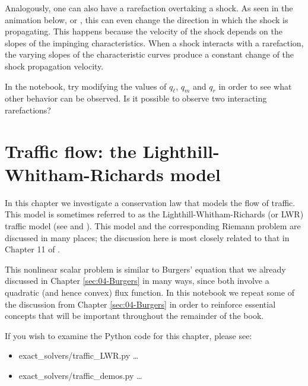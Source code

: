 \documentclass{SIAMbook2016}
\providecommand{\tightlist}{%
      \setlength{\itemsep}{0pt}\setlength{\parskip}{0pt}}
\begin{document}
Analogously, one can also have a rarefaction overtaking a shock. As seen
in the animation below, or
, this can even change the direction in which the shock is
propagating. This happens because the velocity of the shock depends on
the slopes of the impinging characteristics. When a shock interacts with
a rarefaction, the varying slopes of the characteristic curves produce a
constant change of the shock propagation velocity.

In the notebook, try modifying the values of \(q_\ell\), \(q_m\) and
\(q_r\) in order to see what other behavior can be observed. Is it
possible to observe two interacting rarefactions?

\hypertarget{traffic-flow-the-lighthill-whitham-richards-model}{%
\chapter{Traffic flow: the Lighthill-Whitham-Richards
model}\label{traffic-flow-the-lighthill-whitham-richards-model}}
\label{sec:05-Traffic_flow}


In this chapter we investigate a conservation law that models the flow
of traffic. This model is sometimes referred to as the
Lighthill-Whitham-Richards (or LWR) traffic model (see
\cite{lighthill1955kinematic} and \cite{richards1956shock}). This model
and the corresponding Riemann problem are discussed in many places; the
discussion here is most closely related to that in Chapter 11 of
\cite{fvmhp}.

This nonlinear scalar problem is similar to Burgers' equation that we
already discussed in Chapter \ref{sec:04-Burgers} in many ways, since
both involve a quadratic (and hence convex) flux function. In this
notebook we repeat some of the discussion from
Chapter \ref{sec:04-Burgers} in order to reinforce essential concepts
that will be important throughout the remainder of the book.

If you wish to examine the Python code for this chapter, please see:

\begin{itemize}
\tightlist
\item
  {exact\_solvers/traffic\_LWR.py} \ldots{}
\item
  {exact\_solvers/traffic\_demos.py} \ldots{}
\end{itemize}
\end{document}
